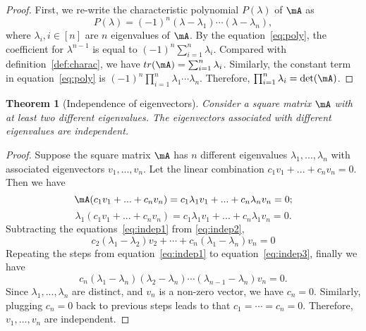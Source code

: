 \documentclass[11pt]{article}
\theoremstyle{plain}
\newtheorem{thm}{Theorem}[section]
\theoremstyle{definition}
\begin{document}
\begin{proof}
	First, we re-write the characteristic polynomial $P(\lambda)$ of $\mA$ as
	\begin{equation}\label{eq:poly}
		P(\lambda) = (-1)^n (\lambda - \lambda_1)\cdots (\lambda - \lambda_n), 
	\end{equation}   
	where $\lambda_i, i \in [n]$ are $n$ eigenvalues of $\mA$. By the equation~\eqref{eq:poly}, the coefficient for $\lambda^{n-1}$ is equal to $(-1)^n\sum_{i=1}^n \lambda_i$. Compared with definition~\ref{def:charac}, we have $tr(\mA) = \sum_{i=1}^n \lambda_i$. Similarly, the constant term in equation~\eqref{eq:poly} is $(-1)^n \prod_{i=1}^n \lambda_1 \cdots \lambda_n $. Therefore, $\prod_{i=1}^n \lambda_i = \det(\mA)$.
\end{proof}


\begin{thm}[Independence of eigenvectors]\label{thm:indepeigen} 
Consider a square matrix $\mA$ with at least two different eigenvalues. The eigenvectors associated with different eigenvalues are independent.
\end{thm}

\begin{proof}
	Suppose the square matrix $\mA$ has $n$ different eigenvalues $\lambda_1,...,\lambda_n$ with associated eigenvectors  $v_1,...,v_n$. Let the linear combination $c_1 v_1 + ... + c_n v_n = 0$.	
	Then we have
	\begin{equation}\label{eq:indep1}
		\mA(c_1 v_1 + ... + c_n v_n ) = c_1 \lambda_1 v_1 + ... + c_n \lambda_n v_n = 0;  
		\end{equation}
		\begin{equation}\label{eq:indep2}
		\lambda_1 (c_1 v_1 + ... + c_n v_n ) = c_1 \lambda_1 v_1 + ... + c_n \lambda_1 v_n = 0. 
	\end{equation}
	Subtracting the equations~\eqref{eq:indep1} from \eqref{eq:indep2}, 
	\begin{equation}\label{eq:indep3}
		 c_2 (\lambda_1 - \lambda_2) v_2 + \cdots + c_n (\lambda_1 - \lambda_n) v_n  = 0
	\end{equation}
	Repeating the steps from equation~\eqref{eq:indep1} to equation~\eqref{eq:indep3}, finally we have 
	\[ c_n(\lambda_1 - \lambda_n)(\lambda_2 - \lambda_n)\cdots (\lambda_{n-1} - \lambda_n) v_n = 0.    \]
	 Since $\lambda_1 ,..., \lambda_n$ are distinct, and $v_n$ is a non-zero vector, we have $c_n = 0$. Similarly, plugging $c_n = 0$ back to previous steps leads to that $c_1 = \cdots = c_n = 0$. Therefore, $v_1,...,v_n$ are independent.
\end{proof}
\end{document}
